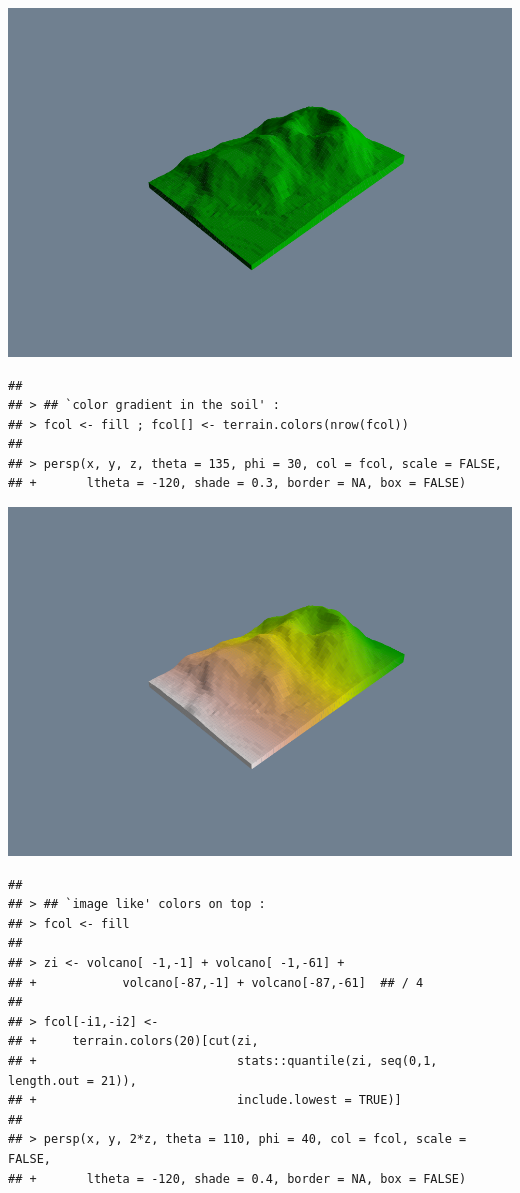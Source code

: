 \documentclass[
]{book}
\begin{document}
\includegraphics{TudodoR_files/figure-latex/unnamed-chunk-146-6.pdf}

\begin{verbatim}
## 
## > ## `color gradient in the soil' :
## > fcol <- fill ; fcol[] <- terrain.colors(nrow(fcol))
## 
## > persp(x, y, z, theta = 135, phi = 30, col = fcol, scale = FALSE,
## +       ltheta = -120, shade = 0.3, border = NA, box = FALSE)
\end{verbatim}

\includegraphics{TudodoR_files/figure-latex/unnamed-chunk-146-7.pdf}

\begin{verbatim}
## 
## > ## `image like' colors on top :
## > fcol <- fill
## 
## > zi <- volcano[ -1,-1] + volcano[ -1,-61] +
## +            volcano[-87,-1] + volcano[-87,-61]  ## / 4
## 
## > fcol[-i1,-i2] <-
## +     terrain.colors(20)[cut(zi,
## +                            stats::quantile(zi, seq(0,1, length.out = 21)),
## +                            include.lowest = TRUE)]
## 
## > persp(x, y, 2*z, theta = 110, phi = 40, col = fcol, scale = FALSE,
## +       ltheta = -120, shade = 0.4, border = NA, box = FALSE)
\end{verbatim}
\end{document}
